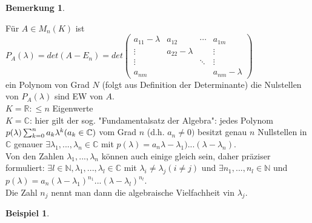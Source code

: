 \documentclass[a4paper,11pt]{article}
\newtheorem{bsp}[definition]{Beispiel}
\newtheorem{bem}[definition]{Bemerkung}
\begin{document}
\begin{bem}
\end{bem}
Für $A\in M_n(K)$ ist $P_A(\lambda)=det(A-E_n)=det\begin{pmatrix}a_{11}-\lambda&a_{12}&\cdots&a_{1m}\\\vdots&a_{22}-\lambda&&\vdots\\\vdots&&\ddots&\vdots\\a_{nm}&&&a_{nm}-\lambda\end{pmatrix}$ \\
ein Polynom von Grad $N$ (folgt aus Definition der Determinante) die Nulstellen von $P_A(\lambda)$ sind EW von $A$. \\
$K=\mathbb{R}:\leq n$ Eigenwerte \\
$K=\mathbb{C}$: hier gilt der sog. "Fundamentalsatz der Algebra": jedes Polynom $p(\lambda)\sum^n_{k=0}a_k\lambda^k \\
(a_k\in\mathbb{C})$ vom Grad $n$ (d.h. $a_n\neq0)$ besitzt genau $n$ Nullstellen in $\mathbb{C}$ genauer $\exists\lambda_1,...,\lambda_n\in\mathbb{C}$ mit $p(\lambda)=a_n\lambda-\lambda_1)...(\lambda-\lambda_n).$\\
Von den Zahlen $\lambda_1,...,\lambda_n$ können auch einige gleich sein, daher präziser formuliert: $\exists l\in\mathbb{N},\lambda_1,...,\lambda_l\in\mathbb{C}$ mit $\lambda_i\neq\lambda_j(i\neq j)$ und $\exists n_1,...,n_l\in\mathbb{N}$ und $p(\lambda)=a_n(\lambda-\lambda_1)^{n_1}...(\lambda-\lambda_l)^{n_l}$. \\
Die Zahl $n_j$ nennt man dann die algebraische Vielfachheit vin $\lambda_j$.
\newpage
\begin{bsp}
\end{bsp}
\end{document}
